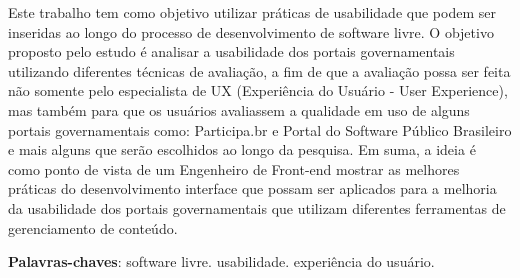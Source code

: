 \begin{resumo}



Este trabalho tem como objetivo utilizar práticas de usabilidade que podem ser inseridas ao longo do processo de desenvolvimento de software livre. O objetivo proposto pelo estudo é analisar a usabilidade dos portais governamentais utilizando diferentes técnicas de avaliação, a fim de que a avaliação possa ser feita não somente pelo especialista de UX (Experiência do Usuário - User Experience), mas também para que os usuários avaliassem a qualidade em uso de alguns portais governamentais como: Participa.br e Portal do Software Público Brasileiro e mais alguns que serão escolhidos ao longo da pesquisa. Em suma, a ideia é como ponto de vista de um Engenheiro de Front-end mostrar as melhores práticas do desenvolvimento interface que possam ser aplicados para a melhoria da usabilidade dos portais governamentais que utilizam diferentes ferramentas de gerenciamento de conteúdo.
 \vspace{\onelineskip}
    
 \noindent
 \textbf{Palavras-chaves}: software livre. usabilidade. experiência do usuário.
\end{resumo}
